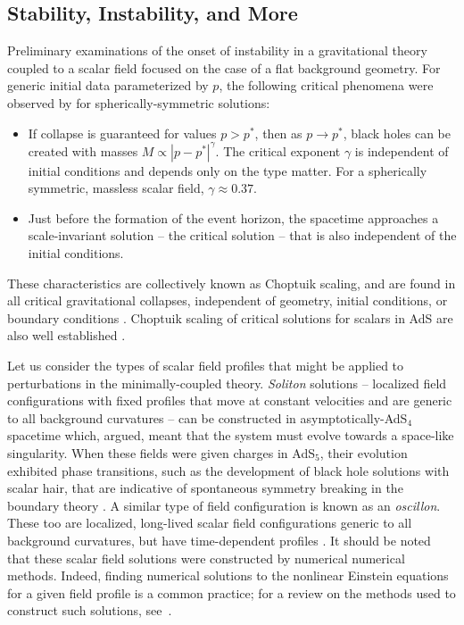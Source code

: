 \documentclass[../PhD.tex]{subfiles}
\begin{document}

\subsection{Stability, Instability, and More}
\label{ssec: stability intro}

Preliminary examinations of the onset of instability in a gravitational theory coupled to a scalar field focused on the case of a flat background geometry. For generic initial data parameterized by $p$, the following critical phenomena were observed by \cite{Choptuik:1992jv} for spherically-symmetric solutions:
\begin{itemize}
\item If collapse is guaranteed for values $p > p^*$, then as $p \to p^*$, black holes can be created with masses $M \propto |p - p^*|^\gamma$. The critical exponent $\gamma$ is independent of initial conditions and depends only on the type matter. For a spherically symmetric, massless scalar field, $\gamma \approx 0.37$.
\item Just before the formation of the event horizon, the spacetime approaches a scale-invariant solution -- the critical solution -- that is also independent of the initial conditions.
\end{itemize}
These characteristics are collectively known as Choptuik scaling, and are found in all critical gravitational collapses, independent of geometry, initial conditions, or boundary conditions \cite{gr-qc/0210101, 1208.2934, 1210.0890}. Choptuik scaling of critical solutions for scalars in AdS are also well established \cite{gr-qc/0109002, hep-th/0101194}. 

Let us consider the types of scalar field profiles that might be applied to perturbations in the minimally-coupled theory. \emph{Soliton} solutions -- localized field configurations with fixed profiles that move at constant velocities and are generic to all background curvatures -- can be constructed in asymptotically-AdS$_4$ spacetime which, \cite{hep-th/0406134} argued, meant that the system must evolve towards a space-like singularity. When these fields were given charges in AdS$_5$, their evolution exhibited phase transitions, such as the development of black hole solutions with scalar hair, that are indicative of spontaneous symmetry breaking in the boundary theory \cite{1301.2452}. A similar type of field configuration is known as an \emph{oscillon}. These too are localized, long-lived scalar field configurations generic to all background curvatures, but have time-dependent profiles \cite{hep-ph/9503217}. It should be noted that these scalar field solutions were constructed by numerical numerical methods. Indeed, finding numerical solutions to the nonlinear Einstein equations for a given field profile is a common practice; for a review on the methods used to construct such solutions, see~\cite{1510.02804}. 
\end{document}
